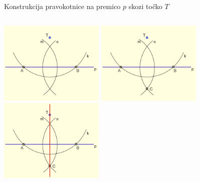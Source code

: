 \begin{frame}{Konstrukcija pravokotnice na premico $p$ skozi točko $T$}
\begin{columns}
\begin{column}{0.45\textwidth}
				\includegraphics[width=50mm]{slike/fig-5.png}%
				\includegraphics[width=50mm]{slike/fig-6.png}%
				\includegraphics[width=50mm]{slike/fig-7.png}%
		\end{column}
	\end{columns}
\end{frame}

